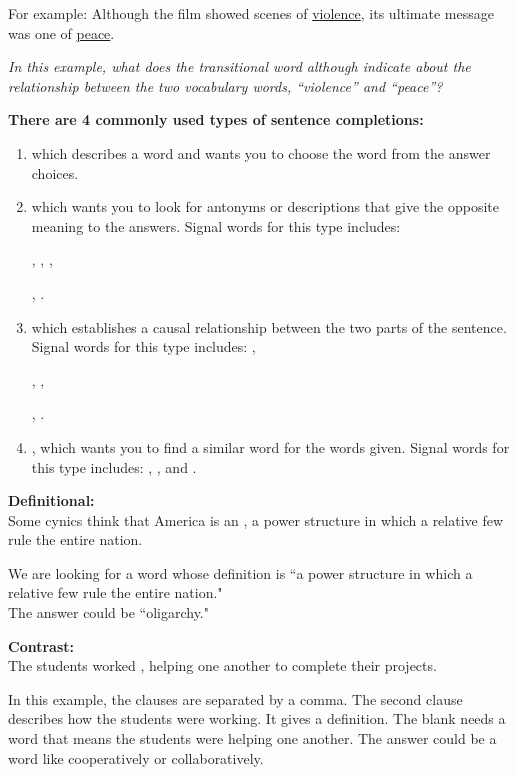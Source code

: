 \documentclass[12pt]{book}
\newcommand{\longline}{\underline{\hspace{2in}} }
\begin{document}
\bigskip
For example:  Although the film showed scenes of \underline{violence}, its ultimate message was one of \underline{peace}.  

\bigskip
\textit{In this example, what does the transitional word \textit{although} indicate about the relationship between the two vocabulary words, “violence” and “peace”?}

\textbf{There are 4 commonly used types of sentence completions:}
\begin{enumerate}
\item \longline which describes a word and wants you to choose the word from the answer choices.
\item \longline which wants you to look for antonyms or descriptions that give the opposite meaning to the answers. Signal words for this type includes:

\longline, \longline, \longline,

\longline, \longline.
\item \longline which establishes a causal relationship between the two parts of the sentence. Signal words for this type includes: \longline,

\longline, \longline,

\longline, \longline.
\item \longline, which wants you to find a similar word for the words given. Signal words for this type includes: \longline, \longline, and \longline.
\end{enumerate}

\bigskip
\textbf{Definitional:}\\
Some cynics think that America is an \longline, a power structure in which a relative few rule the entire nation.

\bigskip
We are looking for a word whose definition is ``a power structure in which a relative few rule the entire nation."\\
The answer could be ``oligarchy."

\bigskip
\textbf{Contrast:}\\
The students worked \longline, helping one another to complete their projects.

\bigskip
In this example, the clauses are separated by a comma.  The second clause describes how the students were working.  It gives a definition.  The blank needs a word that means the students were helping one another.  
The answer could be a word like cooperatively or collaboratively.  

\bigskip
\end{document}

